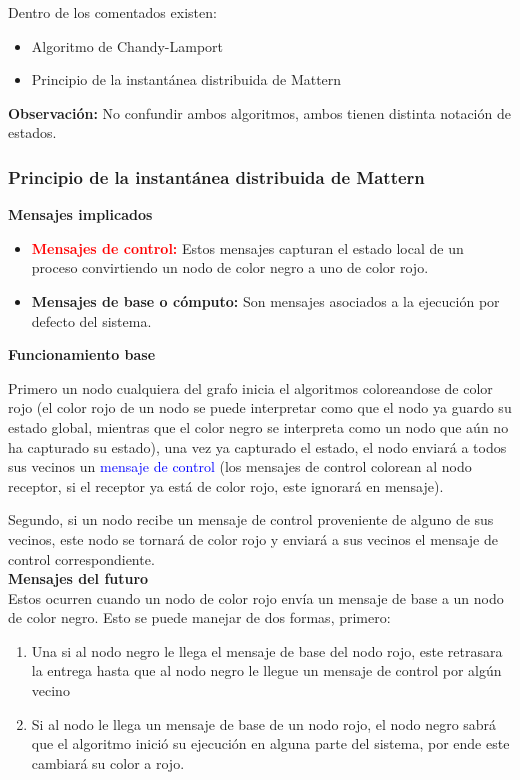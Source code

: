 Dentro de los comentados existen:
\begin{itemize}
  \item Algoritmo de Chandy-Lamport
  \item Principio de la instantánea distribuida de Mattern 
\end{itemize}

\textbf{Observación:} No confundir ambos algoritmos, ambos tienen distinta notación de estados.\\
\subsubsection{Principio de la instantánea distribuida de Mattern}

\textbf{Mensajes implicados}
\begin{itemize}
  \item \textcolor{red}{\textbf{Mensajes de control:}} Estos mensajes capturan el estado local de un proceso convirtiendo un nodo de color negro a uno de color rojo.
  \item \textbf{Mensajes de base o cómputo:} Son mensajes asociados a la ejecución por defecto del sistema.\\
\end{itemize}

\textbf{Funcionamiento base}

Primero un nodo cualquiera del grafo inicia el algoritmos coloreandose de color rojo (el color rojo de un nodo se puede interpretar como que el nodo ya guardo su estado global, mientras que el color negro se interpreta como un nodo que aún no ha capturado su estado), una vez ya capturado el estado, el nodo enviará a todos sus vecinos un \textcolor{blue}{mensaje de control} (los mensajes de control colorean al nodo receptor, si el receptor ya está de color rojo, este ignorará en mensaje).

Segundo, si un nodo recibe un mensaje de control proveniente de alguno de sus vecinos, este nodo se tornará de color rojo y enviará a sus vecinos el mensaje de control correspondiente.
\\

\textbf{Mensajes del futuro}\\
Estos ocurren cuando un nodo de color rojo envía un mensaje de base a un nodo de color negro. Esto se puede manejar de dos formas, primero:
\begin{enumerate}
  \item Una si al nodo negro le llega el mensaje de base del nodo rojo, este retrasara la entrega hasta que al nodo negro le llegue un mensaje de control por algún vecino 
  \item Si al nodo le llega un mensaje de base de un nodo rojo, el nodo negro sabrá que el algoritmo inició su ejecución en alguna parte del sistema, por ende este cambiará su color a rojo.
\end{enumerate}

